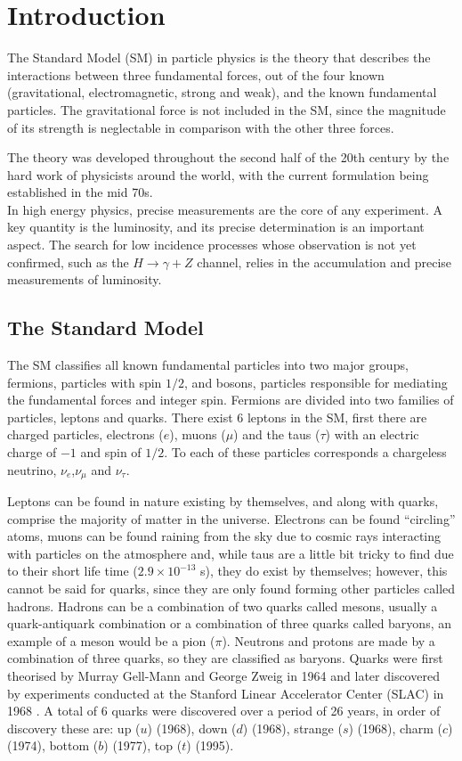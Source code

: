 \chapter{Introduction}
The Standard Model (SM) in particle physics is the theory that describes the interactions between three fundamental forces, out of the four known  (gravitational, electromagnetic, strong and weak), and the known fundamental particles. The gravitational force is not included in the SM, since the magnitude of its strength is neglectable in comparison with the other three forces.

The  theory was developed throughout the second half of the  20th century by the hard work of physicists around the world, with the current formulation being established in the mid 70s.\\
In high energy physics, precise measurements are the core of any experiment. A key quantity is the luminosity, and its precise determination is an important aspect. The search for low incidence processes whose observation is not yet confirmed, such as the $H\rightarrow\gamma + Z$ channel, relies in the accumulation and precise measurements of luminosity.
\section{The Standard Model}


 The SM classifies all known fundamental particles into two major groups, fermions, particles with spin $1/2$, and bosons, particles responsible for mediating the fundamental forces and integer spin.
Fermions are divided into two families of particles, leptons and quarks. There exist 6 leptons in the SM, first there are charged particles,  electrons ($e$), muons ($\mu$) and the taus ($\tau$) with an electric charge of $-1$ and spin of $1/2$. To each of these particles corresponds a chargeless neutrino, $\nu_{e}$,$\nu_{\mu}$ and $\nu_{\tau}$.

Leptons can be found in nature existing by themselves, and along with quarks, comprise the majority of matter in the universe. Electrons can be found “circling”  atoms, muons can be found raining from the sky due to cosmic rays interacting with particles on the atmosphere and, while taus are a little bit tricky to find due to their short life time ($2.9\times10^{-13}$ s), they do exist by themselves; however, this cannot be said for quarks, since they are only found forming other particles called  hadrons. Hadrons can be a combination of two quarks called mesons, usually a quark-antiquark combination or a combination of three quarks called baryons, an example of a meson would be a pion ($\pi$). Neutrons and protons are made by a combination of three quarks, so they are classified as baryons.
Quarks were first theorised by Murray Gell-Mann and George Zweig in 1964 and later discovered by experiments conducted at the Stanford Linear Accelerator Center (SLAC) in 1968 \cite{griff}. A total of 6 quarks were discovered over a period of 26 years, in order of discovery these are: up ($u$) (1968), down ($d$) (1968), strange ($s$) (1968), charm ($c$) (1974), bottom ($b$) (1977), top ($t$) (1995).

